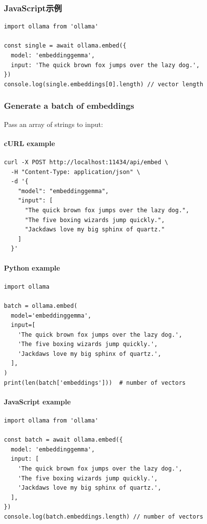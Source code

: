 \documentclass[12pt,UTF8]{ctexbook}
\begin{document}
\subsubsection{JavaScript示例}
\begin{verbatim}
import ollama from 'ollama'

const single = await ollama.embed({
  model: 'embeddinggemma',
  input: 'The quick brown fox jumps over the lazy dog.',
})
console.log(single.embeddings[0].length) // vector length
\end{verbatim}

\subsubsection{Generate a batch of embeddings}
Pass an array of strings to input:

\paragraph{cURL example}
\begin{verbatim}
curl -X POST http://localhost:11434/api/embed \
  -H "Content-Type: application/json" \
  -d '{
    "model": "embeddinggemma",
    "input": [
      "The quick brown fox jumps over the lazy dog.",
      "The five boxing wizards jump quickly.",
      "Jackdaws love my big sphinx of quartz."
    ]
  }'
\end{verbatim}

\paragraph{Python example}
\begin{verbatim}
import ollama

batch = ollama.embed(
  model='embeddinggemma',
  input=[
    'The quick brown fox jumps over the lazy dog.',
    'The five boxing wizards jump quickly.',
    'Jackdaws love my big sphinx of quartz.',
  ],
)
print(len(batch['embeddings']))  # number of vectors
\end{verbatim}

\paragraph{JavaScript example}
\begin{verbatim}
import ollama from 'ollama'

const batch = await ollama.embed({
  model: 'embeddinggemma',
  input: [
    'The quick brown fox jumps over the lazy dog.',
    'The five boxing wizards jump quickly.',
    'Jackdaws love my big sphinx of quartz.',
  ],
})
console.log(batch.embeddings.length) // number of vectors
\end{verbatim}
\end{document}
